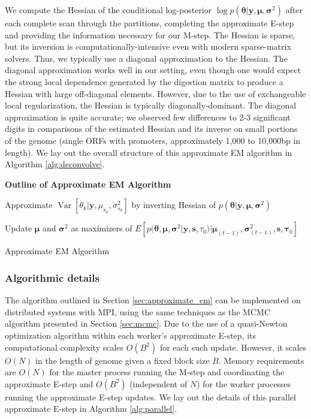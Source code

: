 \documentclass[12pt]{article}
\DeclareMathOperator{\Var}{Var}
\begin{document}
We compute the Hessian of the conditional log-posterior $\log p(\bm \theta | \bm y, \bm \mu, \bm \sigma^2 )$ after each complete scan through the partitions, completing the approximate E-step and providing the information necessary for our M-step.
The Hessian is sparse, but its inversion is computationally-intensive even with modern sparse-matrix solvers.
Thus, we typically use a diagonal approximation to the Hessian.
The diagonal approximation works well in our setting, even though one would expect the strong local dependence generated by the digestion matrix to produce a Hessian with large off-diagonal elements.
However, due to the use of exchangeable local regularization, the Hessian is typically diagonally-dominant.
The diagonal approximation is quite accurate; we observed few differences to 2-3 significant digits in comparisons of the estimated Hessian and its inverse on small portions of the genome (single ORFs with promoters, approximately 1,000 to 10,000bp in length).
%
We lay out the overall structure of this approximate EM algorithm in Algorithm \ref{alg:deconvolve}.

\begin{algorithm}%
\hspace{-8pt} \textbf{Outline of Approximate EM Algorithm} \\
  {
  Approximate $\Var \left[ \theta_k | \bm y, \mu_{s_k}, \sigma^2_{s_k}
    \right]$ by inverting Hessian of $p(\bm \theta | \bm y, \bm \mu, \bm
    \sigma^2 )$
  
  Update $\bm \mu$ and $\bm \sigma^2$ as maximizers of $E \left[ p(\bm \theta,
    \bm \mu, \bm \sigma^2 | \bm y, \bm s, \tau_0) | \bm \mu_{(t-1)}, \bm
    \sigma^2_{(t-1)}, \bm s, \bm \tau_0 \right]$
 }
 \caption{Approximate EM Algorithm \label{alg:deconvolve}}
\end{algorithm}

\subsubsection{Algorithmic details}
\label{sec:mpi}

The algorithm outlined in Section \ref{sec:approximate_em} can be implemented on distributed systems with MPI, using the same techniques as the MCMC algorithm presented in Section \ref{sec:mcmc}.
Due to the use of a quasi-Newton optimization algorithm within each worker's approximate E-step, its computational complexity scales $O(B^2)$ for each such update.
However, it scales $O(N)$ in the length of genome given a fixed block size $B$.
Memory requirements are $O(N)$ for the master process running the M-step and coordinating the approximate E-step and $O(B^2)$ (independent of $N$) for the worker processes running the approximate E-step updates.
We lay out the details of this parallel approximate E-step in Algorithm \ref{alg:parallel}.
\end{document}
